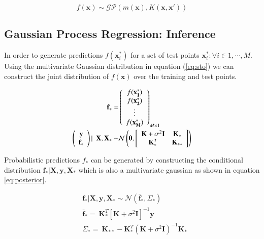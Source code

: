 \documentclass{article}
\begin{document}
\begin{equation}
  f(\mathbf{x}) \sim \mathcal{GP}(m(\mathbf{x}), K(\mathbf{x}, \mathbf{x}'))
\end{equation}

\subsection{Gaussian Process Regression: Inference}

In order to generate predictions $f(\mathbf{x}^{*}_i)$ for a set of
test points $ {\mathbf{x}^{*}_i : \forall i \in 1, \cdots, M} $. Using
the multivariate Gaussian distribution in equation (\ref{eq:sto}) we
can construct the joint distribution of $f(\mathbf{x})$ over the
training and test points.

\begin{align}
  \mathbf{f}_* = & \left( \begin{array}{c} f(\mathbf{x^{*}_1}) \\ f(\mathbf{x^{*}_2}) \\ \vdots \\ f(\mathbf{x^{*}_M}) \end{array} \right)_{M \times 1} \\
  \vspace{4\baselineskip}
  \left( \begin{array}{c} \mathbf{y} \\ \mathbf{f_*} \end{array} \right) | \ \ \mathbf{X}, \mathbf{X}_* \sim & 
                                                                                                               \mathcal{N}\left(\mathbf{0}, \left[ \begin{array}{cc} \mathbf{K} + \sigma^{2} \mathbf{I} & \mathbf{K}_{*} \\ \mathbf{K}_{*}^T & \mathbf{K}_{**} \end{array} \right ] \right) \label{eq:dist}
\end{align}

Probabilistic predictions $f_*$ can be generated by constructing the
conditional distribution
$\mathbf{f_*}|\mathbf{X},\mathbf{y},\mathbf{X_*}$ which is also a
multivariate gaussian as shown in equation \ref{eq:posterior}.

\begin{align}
  & \mathbf{f_*}|\mathbf{X},\mathbf{y},\mathbf{X_*} \sim \mathcal{N}(\mathbf{\bar{f}_*}, \Sigma_*)  \label{eq:posterior} \\
  & \mathbf{\bar{f}_*} =  \ \mathbf{K}^T_{*} [\mathbf{K} + \sigma^{2} \mathbf{I}]^{-1} \mathbf{y} \label{eq:posteriormean} \\
  & \Sigma_* = \ \mathbf{K}_{**} - \mathbf{K}^T_{*} \left(\mathbf{K} + \sigma^{2} \mathbf{I}\right)^{-1} \mathbf{K}_{*} \label{eq:posteriorcov}
\end{align}
\end{document}
